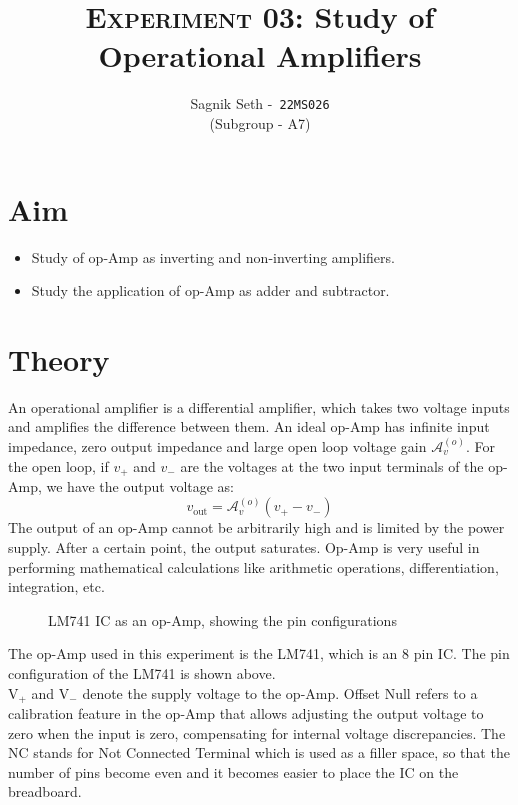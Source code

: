 \documentclass{scrartcl}
\title{
        \Large\textsc{Experiment 03: }
        \huge\textbf{Study of Operational Amplifiers} \\
}
\author{{\Large Sagnik Seth} -\   \texttt{22MS026}\\ ({\small Subgroup - A7}) }
\date{}
\begin{document}
\maketitle
\section{Aim}
\begin{itemize}
    \item Study of op-Amp as inverting and non-inverting amplifiers.
    \item Study the application of op-Amp as adder and subtractor.
\end{itemize}
\section{Theory}
An operational amplifier is a differential amplifier, which takes two voltage inputs and amplifies the difference between them. An ideal op-Amp has infinite input impedance, zero output impedance and large open loop voltage gain $\mathcal{A}_v^{(o)}$. For the open loop, if $v_+$ and $v_-$ are the voltages at the two input terminals of the op-Amp, we have the output voltage as: $$v_{\text{out}} = \mathcal{A}_v^{(o)}(v_+-v_-)$$
The output of an op-Amp cannot be arbitrarily high and is limited by the power supply. After a certain point, the output saturates. Op-Amp is very useful in performing mathematical calculations like arithmetic operations, differentiation, integration, etc.  
\begin{figure}[H]
    \centering
    
    \caption{LM741 IC as an op-Amp, showing the pin configurations}
\end{figure}
\noindent 
The op-Amp used in this experiment is the LM741, which is an 8 pin IC. The pin configuration of the LM741 is shown above.\\[0.3cm] $\mathrm{V}_+$ and $\mathrm{V}_-$ denote the supply voltage to the op-Amp. Offset Null refers to a calibration feature in the op-Amp that allows adjusting the output voltage to zero when the input is zero, compensating for internal voltage discrepancies. The NC stands for Not Connected Terminal which is used as a filler space, so that the number of pins become even and it becomes easier to place the IC on the breadboard. \\[0.3cm]




\end{document}
